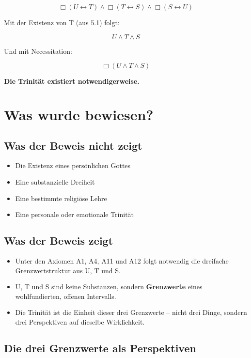 \documentclass[
]{article}
\begin{document}
\[
\Box(U \leftrightarrow T) \land \Box(T \leftrightarrow S) \land \Box(S \leftrightarrow U)
\]

Mit der Existenz von T (aus 5.1) folgt:

\[
\boxed{U \land T \land S}
\]

Und mit Necessitation:

\[
\boxed{\Box(U \land T \land S)}
\]

\textbf{Die Trinität existiert notwendigerweise.}

\section{Was wurde bewiesen?}\label{was-wurde-bewiesen}

\subsection{Was der Beweis nicht zeigt}\label{was-der-beweis-nicht-zeigt}

\begin{itemize}
\item Die Existenz eines persönlichen Gottes
\item Eine substanzielle Dreiheit
\item Eine bestimmte religiöse Lehre
\item Eine personale oder emotionale Trinität
\end{itemize}

\subsection{Was der Beweis zeigt}\label{was-der-beweis-zeigt}

\begin{itemize}
\item Unter den Axiomen A1, A4, A11 und A12 folgt notwendig die dreifache Grenzwertstruktur aus U, T und S.
\item U, T und S sind keine Substanzen, sondern \textbf{Grenzwerte} eines wohlfundierten, offenen Intervalls.
\item Die Trinität ist die Einheit dieser drei Grenzwerte – nicht drei Dinge, sondern drei Perspektiven auf dieselbe Wirklichkeit.
\end{itemize}

\subsection{Die drei Grenzwerte als Perspektiven}\label{die-drei-grenzwerte-als-perspektiven}
\end{document}
